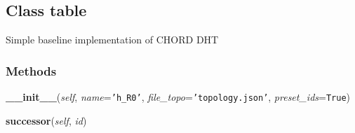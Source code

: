 \subsection{Class table}

    \label{classic_dht:table}
Simple baseline implementation of CHORD DHT



  \subsubsection{Methods}

    \label{classic_dht:table:__init__}

    \vspace{0.5ex}

\hspace{.8\funcindent}\begin{boxedminipage}{\funcwidth}

    \raggedright \textbf{\_\_init\_\_}(\textit{self}, \textit{name}={\tt \texttt{'}\texttt{h\_R0}\texttt{'}}, \textit{file\_topo}={\tt \texttt{'}\texttt{topology.json}\texttt{'}}, \textit{preset\_ids}={\tt True})

\setlength{\parskip}{2ex}
\setlength{\parskip}{1ex}
    \end{boxedminipage}

    \label{classic_dht:table:successor}

    \vspace{0.5ex}

\hspace{.8\funcindent}\begin{boxedminipage}{\funcwidth}

    \raggedright \textbf{successor}(\textit{self}, \textit{id})

\setlength{\parskip}{2ex}
\setlength{\parskip}{1ex}
    \end{boxedminipage}

    \label{classic_dht:table:evaluate}

